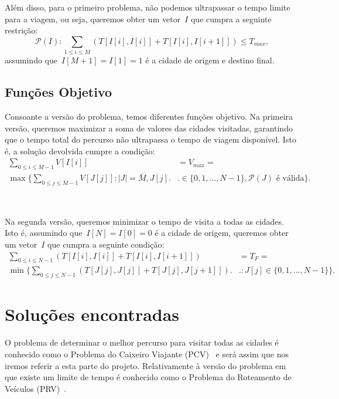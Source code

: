 \documentclass[12pt,a4paper,reqno]{report}
\numberwithin{equation}{section}
\begin{document}
Além disso, para o primeiro problema, não podemos ultrapassar o tempo limite para a viagem, ou seja, queremos obter um vetor~$I$ que cumpra a seguinte restrição:
\begin{equation}
		\mathscr{P}(I): \sum_{1 \leq i \leq M} (T[I[i],I[i]] + T[I[i],I[i+1]]) \leq T_{max},
\end{equation}
assumindo que~$I[M+1] = I[1] = 1$ é a cidade de origem e destino final.

\section{Funções Objetivo}

Consoante a versão do problema, temos diferentes funções objetivo. Na primeira versão, queremos maximizar a soma de valores das cidades visitadas, garantindo que o tempo total do percurso não ultrapassa o tempo de viagem disponível. Isto é, a solução devolvida cumpre a condição:
\begin{equation}
	\begin{split}
		\sum_{0 \leq i \leq M - 1} V[I[i]] & = V_{max} = \\
		\max \Bigg\{\sum_{0 \leq j \leq \bar{M} - 1} V[J[j]] : |J| = \bar{M}, J[j] \Bigg. & \Bigg. \in \{0, 1, \ldots, N-1\}, \mathscr{P}(J) \text{ é válida}\Bigg\}.
	\end{split}
\end{equation}

\
\

Na segunda versão, queremos minimizar o tempo de visita a todas as cidades. Isto é, assumindo que~$I[N] = I[0] = 0$ é a cidade de origem, queremos obter um vetor~$I$ que cumpra a seguinte condição:
\begin{equation}
	\begin{split}
		\sum_{0 \leq i \leq N-1} (T[I[i],I[i]] + T[I[i],I[i+1]]) & = T_F = \\
		\min \Bigg\{\sum_{0 \leq j \leq N - 1} (T[J[j],J[j]] + T[J[j],J[j+1]]) \Bigg. & \Bigg. : J[j] \in \{0, 1, \ldots, N - 1\}\Bigg\}.
	\end{split}
\end{equation}


\chapter{Soluções encontradas}
\label{solucoes}

O problema de determinar o melhor percurso para visitar todas as cidades é conhecido como o Problema do Caixeiro Viajante (PCV)~\cite{wiki_tsp} e será assim que nos iremos referir a esta parte do projeto. Relativamente à versão do problema em que existe um limite de tempo é conhecido como o Problema do Roteamento de Veículos (PRV)~\cite{wiki_vrp}.
\end{document}
